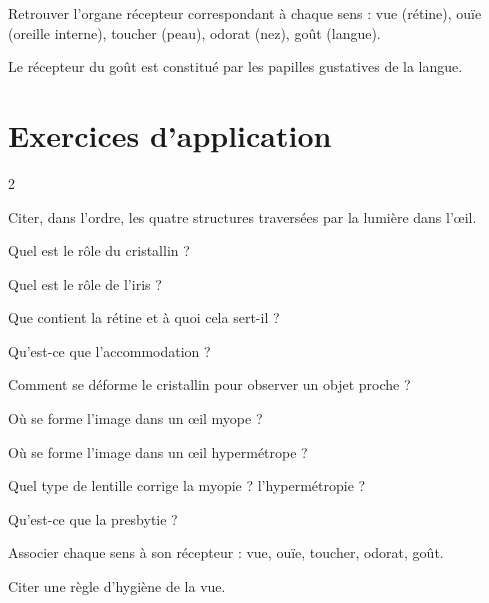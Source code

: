 Retrouver l'organe récepteur correspondant à chaque sens : vue (rétine), ouïe (oreille
interne), toucher (peau), odorat (nez), goût (langue).
\begin{exemple}
Le récepteur du goût est constitué par les papilles gustatives de la langue.
\end{exemple}

\section{Exercices d'application}
\begin{multicols}{2}

\exo{} Citer, dans l'ordre, les quatre structures traversées par la lumière dans
l'œil.

\exo{} Quel est le rôle du cristallin ?

\exo{} Quel est le rôle de l'iris ?

\exo{} Que contient la rétine et à quoi cela sert-il ?

\exo{} Qu'est-ce que l'accommodation ?

\exo{} Comment se déforme le cristallin pour observer un objet proche ?

\exo{} Où se forme l'image dans un œil myope ?

\exo{} Où se forme l'image dans un œil hypermétrope ?

\exo{} Quel type de lentille corrige la myopie ? l'hypermétropie ?

\exo{} Qu'est-ce que la presbytie ?

\exo{} Associer chaque sens à son récepteur : vue, ouïe, toucher, odorat, goût.

\exo{} Citer une règle d'hygiène de la vue.

\end{multicols}

